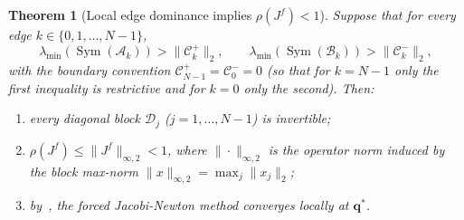 \documentclass{article}
\newtheorem{theorem}{Theorem}
\newcommand{\Sym}{\operatorname{Sym}}
\begin{document}
\begin{theorem}[Local edge dominance implies $\rho(J^f) < 1$]\label{thm:forced-local-dominance}
    Suppose that for every edge $k \in \{0, 1, \ldots, N-1\}$,
    \begin{equation}
        \lambda_{\min}(\Sym(\mathcal{A}_k)) > \|\mathcal{C}^+_k\|_2,
        \qquad
        \lambda_{\min}(\Sym(\mathcal{B}_k)) > \|\mathcal{C}^-_k\|_2,
        \label{eq:local-edge-dominance-notes}
    \end{equation}
    with the boundary convention $\mathcal{C}^+_{N-1}\!=\!\mathcal{C}^-_0\!=\!0$
    (so that for $k = N-1$ only the first inequality is restrictive and for
    $k = 0$ only the second). Then:
    \begin{enumerate}
        \item every diagonal block $\mathcal{D}_j$ ($j = 1, \ldots, N-1$) is invertible;
        \item $\rho(J^f) \leq \|J^f\|_{\infty, 2} < 1$, where $\|\cdot\|_{\infty, 2}$
              is the operator norm induced by the block max-norm
              $\|x\|_{\infty, 2} = \max_j \|x_j\|_2$;
        \item by~\cite[Lemma~4.4]{ferraroParallelIterativeMethod2025}, the forced
              Jacobi-Newton method converges locally at $\mathbf{q}^*$.
    \end{enumerate}
\end{theorem}
\end{document}
